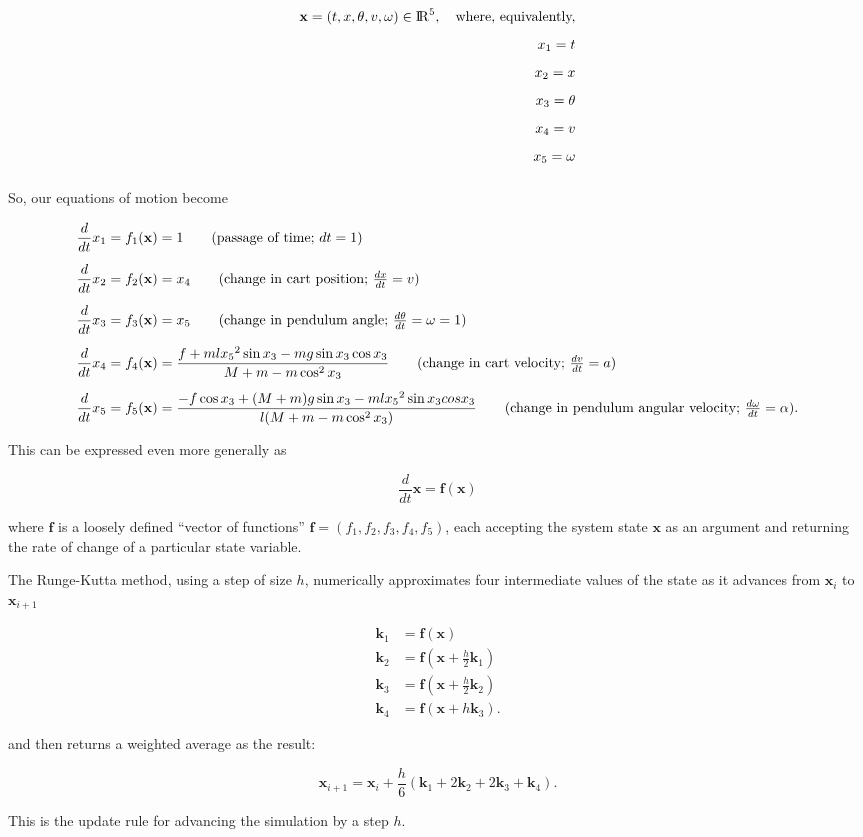 \documentclass[12pt]{article}
\begin{document}
\begin{align}
\mathbf{x} = (t, x, \theta, v, \omega) \in {\rm I\!R}^5, \quad \mbox{where, equivalently,} \\[5pt]
x_1 = t \nonumber\\[5pt]
x_2 = x \nonumber\\[5pt]
x_3 = \theta \nonumber\\[5pt]
x_4 = v \nonumber\\[5pt]
x_5 = \omega \nonumber\\[5pt]
\end{align}

So, our equations of motion become

\begin{align}
\frac{d}{dt} x_1 &= f_1(\mathbf{x}) = 1 \tag*{(passage of time; $dt = 1$)} \nonumber\\[5pt]
\frac{d}{dt} x_2 &= f_2(\mathbf{x}) = x_4 \tag*{(change in cart position; $\frac{dx}{dt} = v$)} \\[5pt]
\frac{d}{dt} x_3 &= f_3(\mathbf{x}) = x_5 \tag*{(change in pendulum angle; $\frac{d\theta}{dt} = \omega = 1$)} \\[5pt]
\frac{d}{dt} x_4 &= f_4(\mathbf{x}) = \frac{f + m l {x_5}^2 \sin{x_3} - m g \sin{x_3} \cos{x_3}}{M + m - m \cos^2{x_3}} \tag*{(change in cart velocity; $\frac{dv}{dt} = a$)} \\[5pt]
\frac{d}{dt} x_5 &= f_5(\mathbf{x}) = \frac{-f \cos{x_3} + (M + m) g \sin{x_3} - m l {x_5}^2 \sin{x_3} cos{x_3}}{l (M + m - m \cos^2{x_3})} \tag*{(change in pendulum angular velocity; $\frac{d\omega}{dt} = \alpha$)}.
\end{align}

This can be expressed even more generally as

\begin{equation}
\frac{d}{dt} \mathbf{x} = \mathbf{f}(\mathbf{x})
\end{equation}

where $\mathbf{f}$ is a loosely defined ``vector of functions'' $\mathbf{f} = (f_1, f_2, f_3, f_4, f_5)$, each accepting the system state $\mathbf{x}$ as an argument and returning the rate of change of a particular state variable.

The Runge-Kutta method, using a step of size $h$, numerically approximates four intermediate values of the state as it advances from $\mathbf{x}_i$ to $\mathbf{x}_{i+1}$

\begin{align}
\mathbf{k}_1 &= \mathbf{f}(\mathbf{x}) \\[5pt]
\mathbf{k}_2 &= \mathbf{f}(\mathbf{x} + \frac{h}{2} \mathbf{k}_1) \\[5pt]
\mathbf{k}_3 &= \mathbf{f}(\mathbf{x} + \frac{h}{2} \mathbf{k}_2) \\[5pt]
\mathbf{k}_4 &= \mathbf{f}(\mathbf{x} + h \mathbf{k}_3).
\end{align}

and then returns a weighted average as the result:

\begin{equation}
\mathbf{x}_{i+1} = \mathbf{x}_i + \frac{h}{6}(\mathbf{k}_1 + 2 \mathbf{k}_2 + 2 \mathbf{k}_3 + \mathbf{k}_4).
\end{equation}

This is the update rule for advancing the simulation by a step $h$.
\end{document}
